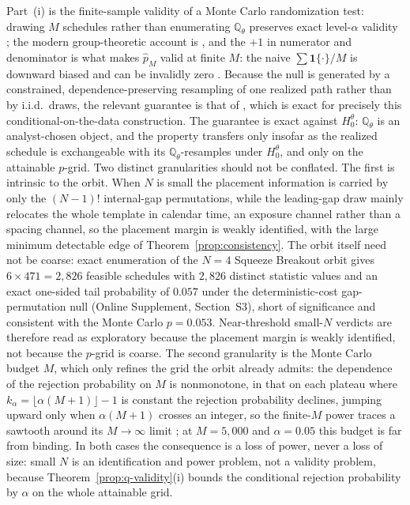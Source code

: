 \documentclass[risks,article,submit,pdftex,oneauthor]{Definitions/mdpi}
\begin{document}
Part~(i) is the finite-sample validity of a Monte Carlo randomization test:
drawing $M$ schedules rather than enumerating $\mathbb{Q}_\theta$ preserves exact
level-$\alpha$ validity \citep{Dwass1957,Hope1968}; the modern group-theoretic
account is \citep{HemerikGoeman2018}, and the $+1$ in numerator and denominator is
what makes $\hat p_M$ valid at finite $M$: the naive $\sum\mathbf
1\{\cdot\}/M$ is downward biased and can be invalidly zero
\citep{PhipsonSmyth2010}. Because the null is generated by a constrained,
dependence-preserving resampling of one realized path rather than by i.i.d.\
draws, the relevant guarantee is that of \citep{BesagClifford1989}, which is exact
for precisely this conditional-on-the-data construction. The guarantee is exact
against $H_0^\theta$: $\mathbb{Q}_\theta$ is an analyst-chosen object, and the
property transfers only insofar as the realized schedule is exchangeable with its
$\mathbb{Q}_\theta$-resamples under $H_0^\theta$, and only on the attainable
$p$-grid. Two distinct granularities should not be conflated. The first is
intrinsic to the orbit. When $N$ is small the placement information is carried by only
the $(N-1)!$ internal-gap permutations, while the leading-gap draw mainly relocates the
whole template in calendar time, an exposure channel rather than a spacing channel, so
the placement margin is weakly identified, with the large minimum detectable edge of
Theorem~\ref{prop:consistency}. The orbit itself need not be coarse: exact enumeration
of the $N=4$ Squeeze Breakout orbit gives $6\times471=2{,}826$ feasible schedules with
$2{,}826$ distinct statistic values and an exact one-sided tail probability of $0.057$
under the deterministic-cost gap-permutation null (Online Supplement, Section~S3), short
of significance and consistent with the Monte Carlo $p=0.053$. Near-threshold small-$N$
verdicts are therefore read as exploratory because the placement margin is weakly
identified, not because the $p$-grid is coarse. The second granularity is
the Monte Carlo budget $M$, which only refines the grid the orbit already admits:
the dependence of the rejection probability on $M$ is nonmonotone, in that on each
plateau where $k_\alpha=\lfloor\alpha(M+1)\rfloor-1$ is constant the rejection
probability declines, jumping upward only when $\alpha(M+1)$ crosses an integer,
so the finite-$M$ power traces a sawtooth around its $M\to\infty$ limit
\citep{Hope1968}; at $M=5{,}000$ and $\alpha=0.05$ this budget is far from binding.
In both cases the consequence is a loss of power, never a
loss of size: small $N$ is an identification and power problem, not a validity problem,
because Theorem~\ref{prop:q-validity}(i) bounds the conditional rejection
probability by $\alpha$ on the whole attainable grid.
\end{document}
